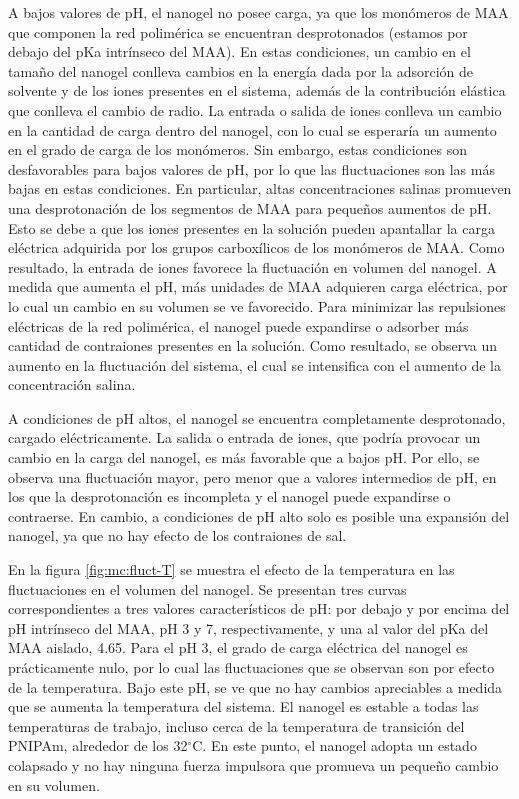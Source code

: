 	A bajos valores de pH, el nanogel no posee carga, ya que los mon\'omeros de MAA que componen la red polim\'erica se encuentran desprotonados (estamos por debajo del pKa intr\'inseco del MAA). En estas condiciones, un cambio en el tama\~no del nanogel conlleva cambios en la energ\'ia dada por la adsorci\'on de solvente y de los iones presentes en el sistema, adem\'as de la contribuci\'on el\'astica que conlleva el cambio de radio.
	La entrada o salida de iones conlleva un cambio en la cantidad de carga dentro del nanogel, con lo cual se esperar\'ia un aumento en el grado de carga de los mon\'omeros. Sin embargo, estas condiciones son desfavorables para bajos valores de pH, por lo que las fluctuaciones son las m\'as bajas en estas condiciones.
	En particular, altas concentraciones salinas promueven una desprotonaci\'on de los segmentos de MAA para peque\~nos aumentos de pH. Esto se debe a que los iones presentes en la soluci\'on pueden apantallar la carga el\'ectrica adquirida por los grupos carbox\'ilicos de los mon\'omeros de MAA. Como resultado, la entrada de iones favorece la fluctuaci\'on en volumen del nanogel.
	A medida que aumenta el pH, m\'as unidades de MAA adquieren carga el\'ectrica, por lo cual un cambio en su volumen se ve favorecido. Para minimizar las repulsiones el\'ectricas de la red polim\'erica, el nanogel puede expandirse o adsorber m\'as cantidad de contraiones presentes en la soluci\'on. Como resultado, se observa un aumento en la fluctuaci\'on del sistema, el cual se intensifica con el aumento de la concentraci\'on salina.
	
	A condiciones de pH altos, el nanogel se encuentra completamente desprotonado, cargado el\'ectricamente. La salida o entrada de iones, que podr\'ia provocar un cambio en la carga del nanogel, es m\'as favorable que a bajos pH. Por ello, se observa una fluctuaci\'on mayor, pero menor que a valores intermedios de pH, en los que la desprotonaci\'on es incompleta y el nanogel puede expandirse o contraerse. En cambio, a condiciones de pH alto solo es posible una expansi\'on del nanogel, ya que no hay efecto de los contraiones de sal.
	
	
	
	
	En la figura \ref{fig:mc:fluct-T} se muestra el efecto de la temperatura en las fluctuaciones en el volumen del nanogel. Se presentan tres curvas correspondientes a tres valores caracter\'isticos de pH: por debajo y por encima del pH intr\'inseco del MAA, pH 3 y 7, respectivamente, y una al valor del pKa del MAA aislado, 4.65.
	Para el pH 3, el grado de carga el\'ectrica del nanogel es pr\'acticamente nulo, por lo cual las fluctuaciones que se observan son por efecto de la temperatura. Bajo este pH, se ve que no hay cambios apreciables a medida que se aumenta la temperatura del sistema. El nanogel es estable a todas las temperaturas de trabajo, incluso cerca de la temperatura de transici\'on del PNIPAm, alrededor de los 32$^\circ$C. En este punto, el nanogel adopta un estado colapsado y no hay ninguna fuerza impulsora que promueva un peque\~no cambio en su volumen.
	

